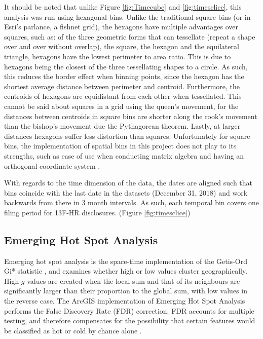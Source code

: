 It should be noted that unlike Figure \ref{fig:Timecube} and \ref{fig:timesclice}, this analysis was run using hexagonal bins. Unlike the traditional square bins (or in Esri's parlance, a fishnet grid), the hexagons have multiple advantages over squares, such as:  of the three geometric forms that can tessellate (repeat a shape over and over without overlap), the  square, the hexagon and the equilateral triangle, hexagons have the lowest perimeter to area ratio.  This is due to hexagons being the closest of the three tessellating shapes to a circle.  As such, this reduces the border effect when binning points, since the hexagon has the shortest average distance between perimeter and centroid.  Furthermore, the centroids of hexagons are equidistant from each other when tessellated.  This cannot be said about squares in a grid using the queen's movement, for the distances between centroids in square bins are shorter along the rook's movement than the bishop's movement due the Pythagorean theorem.  Lastly, at larger distances hexagons suffer less distortion than squares.  Unfortunately for square bins, the implementation of spatial bins in this project does not play to its strengths, such as ease of use when conducting matrix algebra and having an orthogonal coordinate system \citep{birch2007rectangular}. 

With regards to the time dimension of the data, the dates are aligned such that bins coincide with the last date in the datasets (December 31, 2018) and work backwards from there in 3 month intervals.  As such, each temporal bin covers one filing period for 13F-HR disclosures.  (Figure \ref{fig:timesclice})

\subsection{Emerging Hot Spot Analysis}

Emerging hot spot analysis is the space-time implementation of the Getis-Ord Gi* statistic \citep{getis2010analysis}, and examines whether high or low values cluster geographically.  High $g$ values are created when the local sum and that of its neighbours are significantly larger than their proportion to the global sum, with low values in the reverse case. The ArcGIS implementation of Emerging Hot Spot Analysis performs the False Discovery Rate (FDR) correction.  FDR accounts for multiple testing, and therefore compensates for the possibility that certain features would be classified as hot or cold by chance alone \citep{Esri}.

